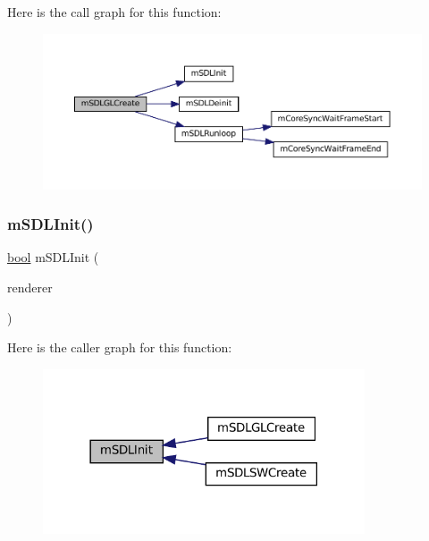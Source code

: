 Here is the call graph for this function\+:
\nopagebreak
\begin{figure}[H]
\begin{center}
\leavevmode
\includegraphics[width=350pt]{pandora-sdl_8c_ac0f0fed0a8f63ea7109a5427609fb678_cgraph}
\end{center}
\end{figure}
\mbox{\label{pandora-sdl_8c_aed39e297edf44f1d18eb5228c4653bb0}} 
\subsubsection{\texorpdfstring{m\+S\+D\+L\+Init()}{mSDLInit()}}
{\footnotesize\ttfamily \mbox{\hyperlink{libretro_8h_a4a26dcae73fb7e1528214a068aca317e}{bool}} m\+S\+D\+L\+Init (\begin{DoxyParamCaption}\item[{struct S\+D\+L\+Software\+Renderer $\ast$}]{renderer }\end{DoxyParamCaption})\hspace{0.3cm}{\ttfamily [static]}}

Here is the caller graph for this function\+:
\nopagebreak
\begin{figure}[H]
\begin{center}
\leavevmode
\includegraphics[width=270pt]{pandora-sdl_8c_aed39e297edf44f1d18eb5228c4653bb0_icgraph}
\end{center}
\end{figure}
\mbox{\label{pandora-sdl_8c_a290e757b4ab3c47950e274fdf8d6c7ea}} 
